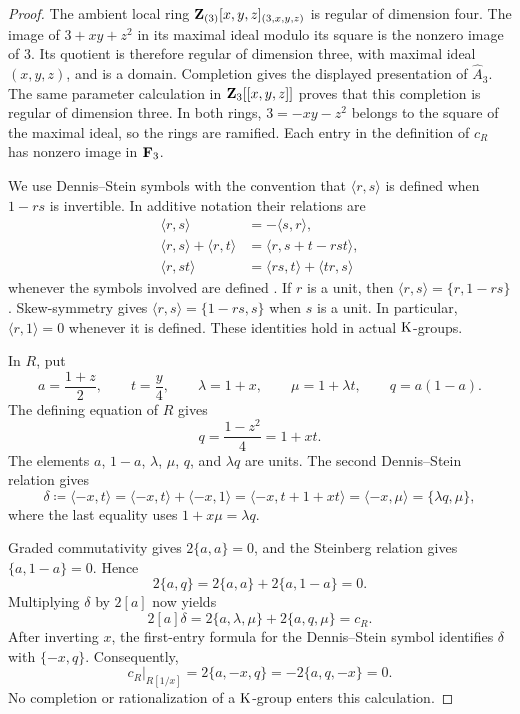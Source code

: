 \begin{proof}
The ambient local ring
$\mathbf{Z}_{(3)}[x,y,z]_{(3,x,y,z)}$ is regular of dimension four.
The image of $3+xy+z^2$ in its maximal ideal modulo its square is the
nonzero image of $3$.
Its quotient is therefore regular of dimension three, with maximal
ideal $(x,y,z)$, and is a domain.
Completion gives the displayed presentation of $\widehat A_3$.
The same parameter calculation in $\mathbf{Z}_3[[x,y,z]]$ proves that this
completion is regular of dimension three.
In both rings, $3=-xy-z^2$ belongs to the square of the maximal ideal,
so the rings are ramified.
Each entry in the definition of $c_R$ has nonzero image in $\mathbf{F}_3$.

We use Dennis--Stein symbols with the convention that
$\langle r,s\rangle$ is defined when $1-rs$ is invertible.
In additive notation their relations are
\begin{align*}
 \langle r,s\rangle&=-\langle s,r\rangle,\\
 \langle r,s\rangle+\langle r,t\rangle
   &=\langle r,s+t-rst\rangle,\\
 \langle r,st\rangle
   &=\langle rs,t\rangle+\langle tr,s\rangle
\end{align*}
whenever the symbols involved are defined
\cite[III, Definition~5.11, relations (D1)--(D3)]{Weibel}.
If $r$ is a unit, then
$\langle r,s\rangle=\{r,1-rs\}$.
Skew-symmetry gives
$\langle r,s\rangle=\{1-rs,s\}$ when $s$ is a unit.
In particular, $\langle r,1\rangle=0$ whenever it is defined.
These identities hold in actual $\operatorname{K}$-groups.

In $R$, put
\[
 a=\frac{1+z}{2},\qquad t=\frac y4,\qquad
 \lambda=1+x,\qquad \mu=1+\lambda t,\qquad q=a(1-a).
\]
The defining equation of $R$ gives
\[
 q=\frac{1-z^2}{4}=1+xt.
\]
The elements $a$, $1-a$, $\lambda$, $\mu$, $q$, and $\lambda q$
are units. The second Dennis--Stein relation gives
\[
 \delta\coloneqq \langle -x,t\rangle
   =\langle -x,t\rangle+\langle -x,1\rangle
   =\langle -x,t+1+xt\rangle
   =\langle -x,\mu\rangle
   =\{\lambda q,\mu\},
\]
where the last equality uses $1+x\mu=\lambda q$.

Graded commutativity gives $2\{a,a\}=0$, and the Steinberg relation
gives $\{a,1-a\}=0$. Hence
\[
 2\{a,q\}=2\{a,a\}+2\{a,1-a\}=0.
\]
Multiplying $\delta$ by $2[a]$ now yields
\[
 2[a]\delta
   =2\{a,\lambda,\mu\}+2\{a,q,\mu\}
   =c_R.
\]
After inverting $x$, the first-entry formula for the Dennis--Stein
symbol identifies $\delta$ with $\{-x,q\}$. Consequently,
\[
 c_R|_{R[1/x]}
   =2\{a,-x,q\}
   =-2\{a,q,-x\}
   =0.
\]
No completion or rationalization of a $\operatorname{K}$-group enters this calculation.
\end{proof}

